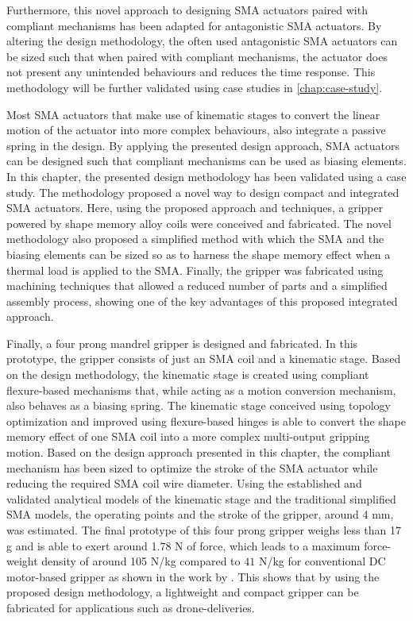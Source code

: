Furthermore, this novel approach to designing SMA actuators paired with compliant mechanisms has been adapted for antagonistic SMA actuators. By altering the design methodology, the often used antagonistic SMA actuators can be sized such that when paired with compliant mechanisms, the actuator does not present any unintended behaviours and reduces the time response. This methodology will be further validated using case studies in \cref{chap:case-study}.

Most SMA actuators that make use of kinematic stages to convert the linear motion of the actuator into more complex behaviours, also integrate a passive spring in the design. By applying the presented design approach, SMA actuators can be designed such that compliant mechanisms can be used as biasing elements. In this chapter, the presented design methodology has been validated using a case study. The methodology proposed a novel way to design compact and integrated SMA actuators. Here, using the proposed approach and techniques, a gripper powered by shape memory alloy coils were conceived and fabricated. The novel methodology also proposed a simplified method with which the SMA and the biasing elements can be sized so as to harness the shape memory effect when a thermal load is applied to the SMA. Finally, the gripper was fabricated using machining techniques that allowed a reduced number of parts and a simplified assembly process, showing one of the key advantages of this proposed integrated approach.

Finally, a four prong mandrel gripper is designed and fabricated. In this prototype, the gripper consists of just an SMA coil and a kinematic stage. Based on the design methodology, the kinematic stage is created using compliant flexure-based mechanisms that, while acting as a motion conversion mechanism, also behaves as a biasing spring. The kinematic stage conceived using topology optimization and improved using flexure-based hinges is able to convert the shape memory effect of one SMA coil into a more complex multi-output gripping motion. Based on the design approach presented in this chapter, the compliant mechanism has been sized to optimize the stroke of the SMA actuator while reducing the required SMA coil wire diameter. Using the established and validated analytical models of the kinematic stage and the traditional simplified SMA models, the operating points and the stroke of the gripper, around 4 mm, was estimated. The final prototype of this four prong gripper weighs less than 17 g and is able to exert around 1.78 N of force, which leads to a maximum force-weight density of around 105 N/kg compared to $41$ N/kg for conventional DC motor-based gripper as shown in the work by \cite{leeClosedStructureCompliantGripper2021}. This shows that by using the proposed design methodology, a lightweight and compact gripper can be fabricated for applications such as drone-deliveries.
